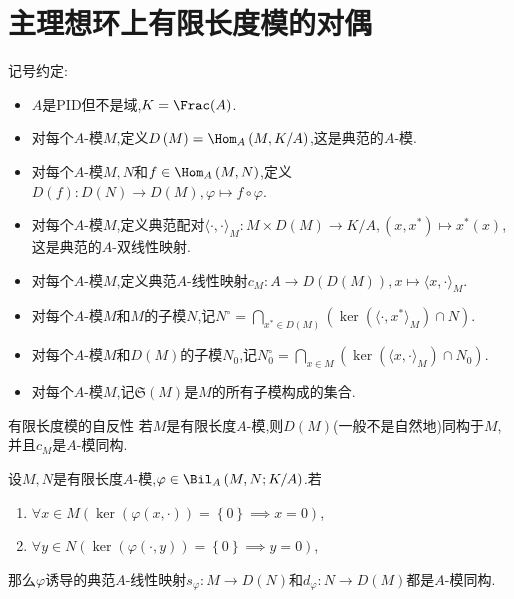 \section{主理想环上有限长度模的对偶}

记号约定:
\begin{itemize}
	\item $A$是PID但不是域,$K=\Frac(A)$.
	\item 对每个$A$-模$M$,定义$D\left(M\right)=\Hom_{A}\left(M,K/A\right)$,这是典范的$A$-模.
	\item 对每个$A$-模$M,N$和$f\in\Hom_{A}\left(M,N\right)$,定义$D\left(f\right):D\left(N\right)\to D\left(M\right),\varphi\mapsto f\circ\varphi$.
	\item 对每个$A$-模$M$,定义典范配对$\langle\cdot,\cdot\rangle_{M}:M\times D\left(M\right)\to K/A,\left(x,x^{\ast}\right)\mapsto x^{\ast}\left(x\right)$,这是典范的$A$-双线性映射.
	\item 对每个$A$-模$M$,定义典范$A$-线性映射$c_{M}:A\to D\left(D\left(M\right)\right),x\mapsto\langle x,\cdot\rangle_{M}$.
	\item 对每个$A$-模$M$和$M$的子模$N$,记$N^{\circ}=\bigcap\limits_{x^{\ast}\in D\left(M\right)}\left(\ker\left(\langle \cdot,x^{\ast}\rangle_{M}\right)\cap N\right)$.
	\item 对每个$A$-模$M$和$D\left(M\right)$的子模$N_{0}$,记$N_{0}^{\circ}=\bigcap\limits_{x\in M}\left(\ker\left(\langle x,\cdot\rangle_{M}\right)\cap N_{0}\right)$.
		\item 对每个$A$-模$M$,记$\mathfrak{S}\left(M\right)$是$M$的所有子模构成的集合.
\end{itemize}

\begin{proposition}{有限长度模的自反性}{}
	若$M$是有限长度$A$-模,则$D\left(M\right)$(一般不是自然地)同构于$M$,并且$c_{M}$是$A$-模同构.
\end{proposition}

\begin{corollary}{}{}
	设$M,N$是有限长度$A$-模,$\varphi\in\Bil_{A}\left(M,N;K/A\right)$.若
	\begin{enumerate}
		\item $\forall x\in M\left(\ker\left(\varphi\left(x,\cdot\right)\right)=\left\{0\right\}\implies x=0\right)$,
		\item $\forall y\in N\left(\ker\left(\varphi\left(\cdot,y\right)\right)=\left\{0\right\}\implies y=0\right)$,
	\end{enumerate}
	那么$\varphi$诱导的典范$A$-线性映射$s_{\varphi}:M\to D\left(N\right)$和$d_{\varphi}:N\to D\left(M\right)$都是$A$-模同构.
\end{corollary}

